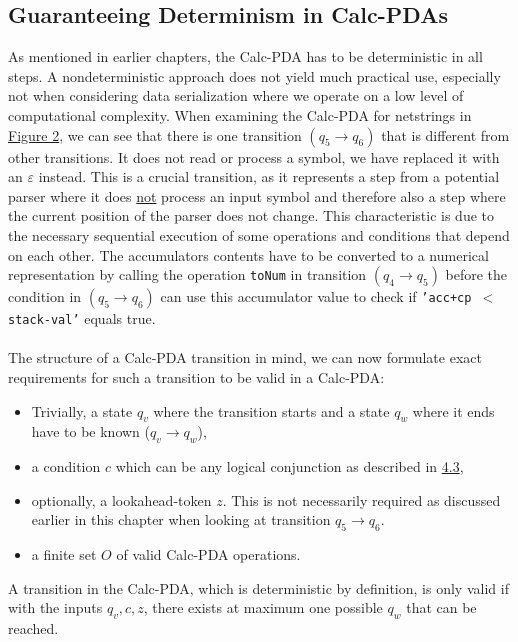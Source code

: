 \subsection{Guaranteeing Determinism in Calc-PDAs}
\label{4.5}
As mentioned in earlier chapters, the Calc-PDA has to be deterministic in all steps. A nondeterministic approach does not yield much practical use, especially not when considering data serialization where we operate on a low level of computational complexity. When examining the Calc-PDA for netstrings in \hyperref[fig:fig-2-netstring-Calc-pda-1]{Figure 2}, we can see that there is one transition $(q_5 \rightarrow q_6)$ that is different from other transitions. It does not read or process a symbol, we have replaced it with an $\varepsilon$ instead. This is a crucial transition, as it represents a step from a potential parser where it does \underline{not} process an input symbol and therefore also a step where the current position of the parser does not change. This characteristic is due to the necessary sequential execution of some operations and conditions that depend on each other. The accumulators contents have to be converted to a numerical representation by calling the operation \texttt{toNum} in transition $(q_4 \rightarrow q_5)$ before the condition in $(q_5 \rightarrow q_6)$ can use this accumulator value to check if \texttt{'acc+cp $<$ stack-val'} equals true.\\\\
The structure of a Calc-PDA transition in mind, we can now formulate exact requirements for such a transition to be valid in a Calc-PDA:
\begin{itemize}
    \item Trivially, a state $q_v$ where the transition starts and a state $q_w$ where it ends have to be known ($q_v \rightarrow q_w$),
    \item a condition $c$ which can be any logical conjunction as described in \hyperref[4.3]{4.3},
    \item optionally, a lookahead-token $z$. This is not necessarily required as discussed earlier in this chapter when looking at transition $q_5 \rightarrow q_6$.
    \item a finite set $O$ of valid Calc-PDA operations.
\end{itemize}
A transition in the Calc-PDA, which is deterministic by definition, is only valid if with the inputs $q_v,c,z$, there exists at maximum one possible $q_w$ that can be reached.\\\\

